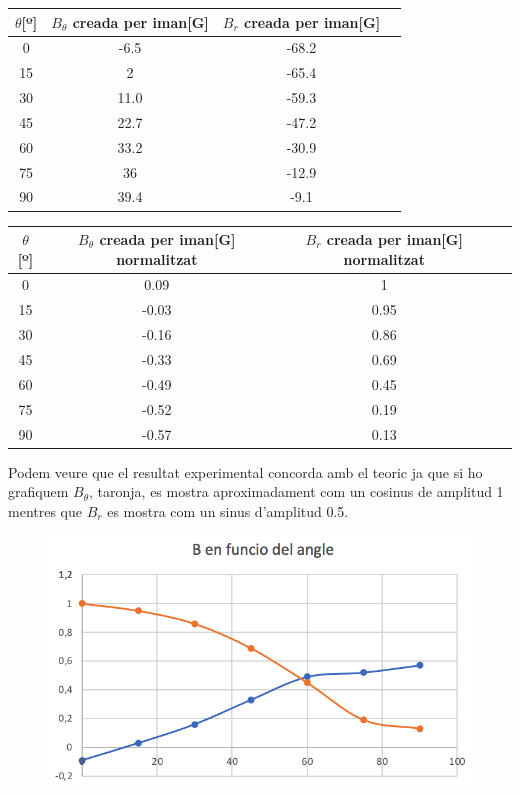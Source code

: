 \documentclass[12pt, a4papre]{article}
\begin{document}
	\begin{center}
		\begin{tabular}{ |c | c | c | c |}
			\hline
			$\theta$[º]  & $B_{\theta}$ creada per iman[G] & $B_r$ creada per iman[G]  \\ \hline
			0 		&   -6.5		&   -68.2\\ 
			15 		&   2			&-65.4\\
			30 		&   11.0		&-59.3\\
			45		&   22.7		&-47.2\\
			60 		& 33.2		&-30.9\\
			75 		&   36		&-12.9\\
			90		&  39.4		&-9.1\\
			\hline
		\end{tabular}
	\end{center}
	
	\begin{center}
		\begin{tabular}{ |c | c | c | c |}
			\hline
			$\theta$[º]  & $B_{\theta}$ creada per iman[G] normalitzat & $B_r$ creada per iman[G] normalitzat \\ \hline
			0 		&   0.09			&   1\\ 
			15 		&   -0.03			&0.95\\
			30 		&   -0.16			&0.86\\
			45		&   -0.33			&0.69\\
			60 		&  -0.49			&0.45\\
			75 		&   -0.52			&0.19\\
			90		&  -0.57			&0.13\\
			\hline
		\end{tabular}
	\end{center}
	
	Podem veure que el resultat experimental concorda amb el teoric ja que si ho grafiquem $B_{\theta}$, taronja, es mostra aproximadament com un cosinus de amplitud 1 mentres que $B_r$ es mostra com un sinus d'amplitud 0.5.
	\begin{figure}[H]
		\begin{center}
		\includegraphics[width=130mm]{GraficaEM.png}
		\end{center}
	\end{figure}
	
\end{document}
